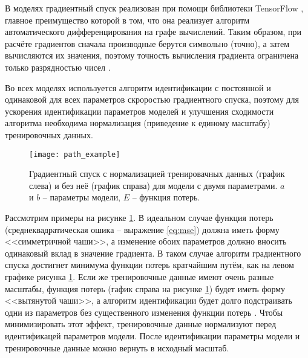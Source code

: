 	В моделях градиентный спуск реализован при помощи библиотеки TensorFlow
	\cite{tf_website}, главное преимущество которой в том, что она реализует
	алгоритм автоматического дифференцирования на графе вычислений. Таким 
	образом, при расчёте градиентов сначала производные берутся символьно 
	(точно), а затем вычисляются их значения, поэтому точность вычисления 
	градиента ограничена только разрядностью чисел 
	\cite{hands_on_ml, nikolenko_deep_learning, tf_website}.

	Во всех моделях используется алгоритм идентификации с постоянной и одинаковой
	для всех параметров скроростью градиентного спуска, поэтому для ускорения 
	идентификации параметров моделей и улучшения сходимости алгоритма необходима 
	нормализация (приведение к единому масштабу) тренировочных данных.
	
	\begin{figure}[!htp]
		\centering
		\texttt{[image: path\_example]}
		\caption{Градиентный спуск с нормализацией тренировачных данных (график
		слева) и без неё (график справа) для модели с двумя параметрами. $a$ и 
		$b$ -- параметры модели, $E$ -- функция потерь.}
		\label{pic:path_example}
	\end{figure}

	Рассмотрим примеры на рисунке \ref{pic:path_example}. В идеальном случае 
	функция потерь (среднеквадратическая ошика -- выражение \ref{eq:mse}) должна
	иметь форму <<симметричной чаши>>, а изменение обоих параметров должно вносить 
	одинаковый вклад в значение градиента. В таком случае алгоритм градиентного 
	спуска достигнет минимума функции потерь кратчайшим путём, как на левом 
	графике рисунка \ref{pic:path_example}. Если же тренировочные данные имеют
	очень разные масштабы, функция потерь (гафик справа на рисунке 
	\ref{pic:path_example}) будет иметь форму <<вытянутой чаши>>, а алгоритм 
	идентификации будет долго подстраивать одни из параметров без существенного
	изменения функции потерь \cite{hands_on_ml}. Чтобы минимизировать этот 
	эффект,	тренировочные данные нормализуют перед идентификацей параметров 
	модели. После идентификации параметры модели и тренировочные данные можно
	вернуть в исходный масштаб.

